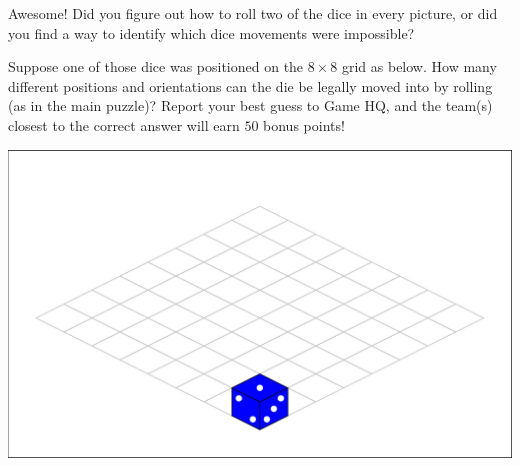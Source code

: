 
Awesome! Did you figure out how to roll two of the dice in every picture,
  or did you find a way to identify which dice movements were impossible?

  Suppose one of those dice was positioned on the \(8\times 8\) grid
  as below. How many different positions and orientations can the die
  be legally moved into by rolling (as in the main puzzle)?
  Report your best guess to Game HQ, and the team(s)
  closest to the correct answer will earn \(50\) bonus points!

  \begin{center}
  \includegraphics[width=0.8\linewidth]{diceExtra.png}
  \end{center}